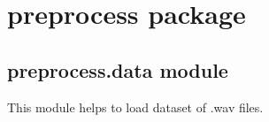 \documentclass[letterpaper,10pt,english]{sphinxmanual}
\begin{document}
\chapter{preprocess package}
\label{\detokenize{docs/source/preprocess:preprocess-package}}\label{\detokenize{docs/source/preprocess::doc}}

\section{preprocess.data module}
\label{\detokenize{docs/source/preprocess:module-preprocess.data}}\label{\detokenize{docs/source/preprocess:preprocess-data-module}}
This module helps to load dataset of .wav files.
\end{document}
